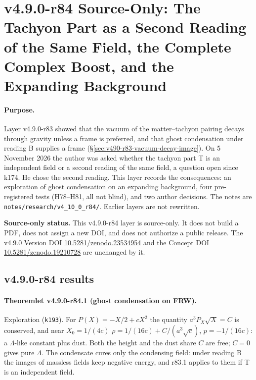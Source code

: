 
\clearpage
\section*{v4.9.0-r84 Source-Only: The Tachyon Part as a Second Reading of the Same Field, the Complete Complex Boost, and the Expanding Background}
\label{sec:v490-r84-second-reading}

\paragraph{Purpose.}
Layer v4.9.0-r83 showed that the vacuum of the matter--tachyon pairing decays through gravity unless a frame is preferred, and that
ghost condensation under reading B supplies a frame (\S\ref{sec:v490-r83-vacuum-decay-image}).  On 5 November 2026 the author was
asked whether the tachyon part T is an independent field or a second reading of the same field, a question open since k174.  He chose
the second reading.  This layer records the consequences: an exploration of ghost condensation on an expanding background, four
pre-registered tests (H78--H81, all not blind), and two author decisions.  The notes are
\texttt{notes/\allowbreak research/\allowbreak v4\_10\_0\_r84/}.  Earlier layers are not rewritten.

\noindent\textbf{Source-only status.}
This v4.9.0-r84 layer is source-only.  It does not build a PDF, does not assign a new DOI,
and does not authorize a public release.  The v4.9.0 Version DOI
\href{https://doi.org/10.5281/zenodo.23534954}{10.5281/zenodo.23534954} and the Concept DOI
\href{https://doi.org/10.5281/zenodo.19210728}{10.5281/zenodo.19210728} are unchanged by it.

\subsection*{v4.9.0-r84 results}
\label{subsec:v490-r84-results}

\paragraph{Theoremlet v4.9.0-r84.1 (ghost condensation on FRW).}
Exploration (\texttt{k193}).  For \(P(X)=-X/2+cX^2\) the quantity \(a^3P_X\sqrt X=C\) is conserved, and near \(X_0=1/(4c)\)
\(\rho=1/(16c)+C/(a^3\sqrt c)\), \(p=-1/(16c)\): a \(\Lambda\)-like constant plus dust.  Both the height and the dust share \(C\) are free;
\(C=0\) gives pure \(\Lambda\).  The condensate cures only the condensing field: under reading B the images of massless fields keep negative
energy, and r83.1 applies to them if T is an independent field.

